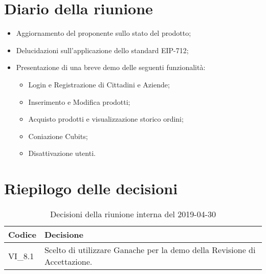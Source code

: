 \section{Diario della riunione}
\begin{itemize}
	\item Aggiornamento del proponente sullo stato del prodotto;
	\item Delucidazioni sull'applicazione dello standard EIP-712;
	\item Presentazione di una breve demo delle seguenti funzionalità:
	\begin{itemize}
		\item Login e Registrazione di Cittadini e Aziende;
		\item Inserimento e Modifica prodotti;
		\item Acquisto prodotti e visualizzazione storico ordini;
		\item Coniazione Cubits;
		\item Disattivazione utenti.
	\end{itemize}
\end{itemize}

\hspace{3cm}

\section{Riepilogo delle decisioni}

	
	\begin{longtable}{ >{\centering}p{} >{}p{}}
		\caption{Decisioni della riunione interna del 2019-04-30}\\	
		\rowcolorhead
		\textbf{\color{white}Codice} 
		& \centering\textbf{\color{white}Decisione} 
		\tabularnewline 
		\endfirsthead
		VI\_8.1 & Scelto di utilizzare Ganache per la demo della Revisione di 
		Accettazione.
		
		
	\end{longtable}
	




